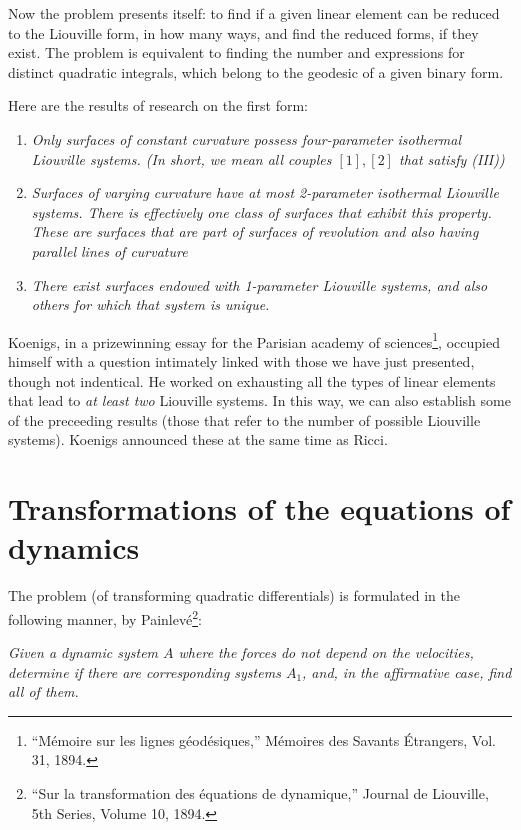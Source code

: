 \documentclass{book}
\begin{document}
Now the problem presents itself: to find if a given linear element can be reduced to the Liouville form, in how many ways, and find the reduced forms, if they exist. The problem is equivalent to finding the number and expressions for distinct quadratic integrals, which belong to the geodesic of a given binary form.

Here are the results of research on the first form:
\begin{enumerate}
	\item \emph{Only surfaces of constant curvature possess four-parameter isothermal Liouville systems. (In short, we mean all couples $[1],[2]$ that satisfy (III))} 
	\item \emph{Surfaces of varying curvature have at most 2-parameter isothermal Liouville systems. There is effectively one class of surfaces that exhibit this property. These are surfaces that are part of surfaces of revolution and also having parallel lines of curvature}
	\item \emph{There exist surfaces endowed with 1-parameter Liouville systems, and also others for which that system is unique.}
\end{enumerate}

Koenigs, in a prizewinning essay for the Parisian academy of sciences\footnote{``M\'emoire sur les lignes g\'eod\'esiques,'' M\'emoires des Savants \'Etrangers, Vol. 31, 1894.}, occupied himself with a question intimately linked with those we have just presented, though not indentical. He worked on exhausting all the types of linear elements that lead to \emph{at least two} Liouville systems. In this way, we can also establish some of the preceeding results (those that refer to the number of possible Liouville systems). Koenigs announced these at the same time as Ricci.

\section{Transformations of the equations of dynamics}

The problem (of transforming quadratic differentials) is formulated in the following manner, by Painlev\'e\footnote{``Sur la transformation des \'equations de dynamique,'' Journal de Liouville, 5th Series, Volume 10, 1894.}:

\emph{Given a dynamic system $A$ where the forces do not depend on the velocities, determine if there are corresponding systems $A_1$, and, in the affirmative case, find all of them.}
\end{document}
